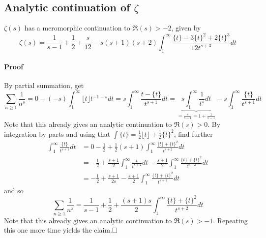 \documentclass{scrartcl}
\begin{document}
\subsection{Analytic continuation of $\zeta$}
$\zeta(s)$ has a meromorphic continuation to $\Re(s) > -2$, given by
\begin{equation*}
    \zeta(s) = \frac 1 {s - 1} + \frac 1 2 + \frac s {12} - s(s + 1)(s + 2) \int_1^\infty \frac {\{t\} - 3\{t\}^2 + 2\{t\}^3} {12t^{s + 3}} dt
\end{equation*}
\paragraph{Proof} By partial summation, get
\begin{equation*}
    \sum_{n \geq 1} \frac 1 {n^s} = 0 - (-s)\int_1^\infty \lfloor t \rfloor t^{-1 - s} dt = s\int_1^\infty \frac {t - \{t\}} {t^{s + 1}} dt = \underbrace{s \int_1^\infty \frac 1 {t^s} dt}_{= \frac s {s - 1} = 1 + \frac 1 {s - 1}} - s\int_1^\infty \frac {\{t\}} {t^{s + 1}} dt
\end{equation*}
Note that this already gives an analytic continuation to $\Re(s) > 0$.
By integration by parts and using that $\int \{t\} = \frac 1 2 \lfloor t \rfloor + \frac 1 2 \{t\}^2$, find further
\begin{align*}
    \int_1^\infty \frac {\{t\}} {t^{s + 1}} dt &= 0 - \frac 1 2 + \frac 1 2(s + 1)\int_1^\infty \frac {\lfloor t \rfloor + \{t\}^2} {t^{s + 2}} dt \\
    &= -\frac 1 2 + \frac {s + 1} 2 \int_1^\infty \frac t {t^{s + 2}} dt - \frac {s + 1} 2 \int_1^\infty \frac {\{t\} + \{t\}^2} {t^{s + 2}} dt \\
    &= -\frac 1 2 + \frac {s + 1} {2s} - \frac {s + 1} 2 \int_1^\infty \frac {\{t\} + \{t\}^2} {t^{s + 1}} dt
\end{align*}
and so
\begin{equation*}
    \sum_{n \geq 1} \frac 1 {n^s} = \frac 1 {s - 1} + \frac 1 2 + \frac {(s + 1)s} 2 \int_1^\infty \frac {\{t\} + \{t\}^2} {t^{s + 2}} dt
\end{equation*}
Note that this already gives an analytic continuation to $\Re(s) > -1$.
Repeating this one more time yields the claim.$\hfill\square$
\end{document}
